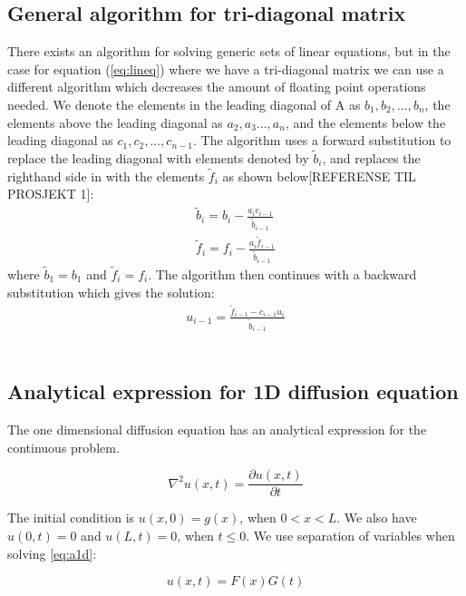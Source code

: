 \documentclass{article}
\begin{document}
\subsection{General algorithm for tri-diagonal matrix}

There exists an algorithm for solving generic sets of linear equations, but in the case for equation (\ref{eq:lineq})  where we have a tri-diagonal matrix we can use a different algorithm which decreases the amount of floating point operations needed. We denote the elements in the leading diagonal of A as $b_1, b_2, ..., b_n$, the elements above the leading diagonal as $a_2, a_3 ..., a_n$, and the elements below the leading diagonal as $c_1, c_2, ..., c_{n-1}$. The algorithm uses a forward substitution to replace the leading diagonal with elements denoted by $\tilde{b}_i$, and replaces the righthand side in with the elements $\tilde{f}_i$ as shown below[REFERENSE TIL PROSJEKT 1]:
\begin{align*}
\tilde{b}_i=b_i-\frac{a_ic_{i-1}}{\tilde{b}_{i-1}} \\
\tilde{f}_i=f_i-\frac{a_i\tilde{f}_{i-1}}{\tilde{b}_{i-1}}
\end{align*}
where $\tilde{b}_1=b_1$ and $\tilde{f}_i=f_i$. The algorithm then continues with a backward substitution which gives the solution:
\begin{align}
u_{i-1}=\frac{\tilde{f}_{i-1}-c_{i-1}u_i}{\tilde{b}_{i-1}}
\end{align}
\\

\subsection{Analytical expression for 1D diffusion equation}

The one dimensional diffusion equation has an analytical expression for the continuous problem. 

\begin{equation}
\nabla ^2 u(x,t)=\frac{\partial u(x,t)}{\partial t}
\label{eq:a1d}
\end{equation}

The initial condition is $u(x,0)=g(x)$, when $0<x<L$. We also have $u(0,t)=0$ and $u(L,t)=0$, when $t\leq0$. We use separation of variables when solving \ref{eq:a1d}:

\begin{equation}
u(x,t) = F(x)G(t)
\label{eq:sep}
\end{equation}
\end{document}
